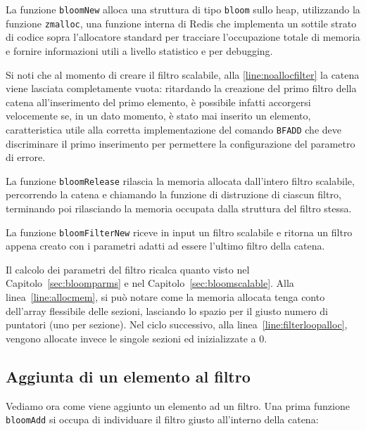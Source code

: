 

La funzione \verb|bloomNew| alloca una struttura di tipo \verb|bloom| sullo heap, utilizzando la
funzione \verb|zmalloc|, una funzione interna di Redis che implementa un sottile strato di codice
sopra l'allocatore standard per tracciare l'occupazione totale di memoria e fornire informazioni
utili a livello statistico e per debugging. 

Si noti che al momento di creare il filtro scalabile, alla \autoref{line:noallocfilter} la catena
viene lasciata completamente vuota: ritardando la creazione del primo filtro della catena
all'inserimento del primo elemento, è possibile infatti accorgersi velocemente se, in un dato
momento, è stato mai inserito un elemento, caratteristica utile alla corretta implementazione del
comando \verb|BFADD| che deve discriminare il primo inserimento per permettere la configurazione del
parametro di errore.

La funzione \verb|bloomRelease| rilascia la memoria allocata dall'intero filtro scalabile, percorrendo
la catena e chiamando la funzione di distruzione di ciascun filtro, terminando poi rilasciando la
memoria occupata dalla struttura del filtro stessa.



La funzione \verb|bloomFilterNew| riceve in input un filtro scalabile e ritorna un filtro appena
creato con i parametri adatti ad essere l'ultimo filtro della catena.

Il calcolo dei parametri del filtro ricalca quanto visto nel Capitolo~\ref{sec:bloomparms} e nel
Capitolo~\ref{sec:bloomscalable}. Alla linea~\ref{line:allocmem}, si può notare come la memoria
allocata tenga conto dell'array flessibile delle sezioni, lasciando lo spazio per il giusto numero
di puntatori (uno per sezione). Nel ciclo successivo, alla linea~\ref{line:filterloopalloc}, vengono
allocate invece le singole sezioni ed inizializzate a $0$.

\subsection{Aggiunta di un elemento al filtro}

Vediamo ora come viene aggiunto un elemento ad un filtro. Una prima funzione \verb|bloomAdd| si
occupa di individuare il filtro giusto all'interno della catena:

